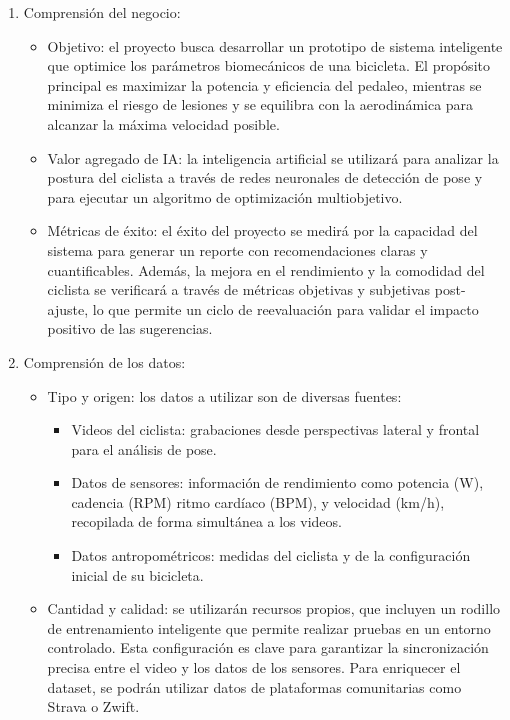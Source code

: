 \documentclass[
11pt, %
]{charter}
\begin{document}
\begin{enumerate}
  \item Comprensión del negocio:
    \begin{itemize}
      \item Objetivo: el proyecto busca desarrollar un prototipo de sistema inteligente que optimice los parámetros biomecánicos de una bicicleta. El propósito principal es maximizar la potencia y eficiencia del pedaleo, mientras se minimiza el riesgo de lesiones y se equilibra con la aerodinámica para alcanzar la máxima velocidad posible.
      \item Valor agregado de IA: la inteligencia artificial se utilizará para analizar la postura del ciclista a través de redes neuronales de detección de pose y para ejecutar un algoritmo de optimización multiobjetivo.
      \item Métricas de éxito: el éxito del proyecto se medirá por la capacidad del sistema para generar un reporte con recomendaciones claras y cuantificables. Además, la mejora en el rendimiento y la comodidad del ciclista se verificará a través de métricas objetivas y subjetivas post-ajuste, lo que permite un ciclo de reevaluación para validar el impacto positivo de las sugerencias.
    \end{itemize}

  \item Comprensión de los datos:
    \begin{itemize}
      \item Tipo y origen: los datos a utilizar son de diversas fuentes:
        \begin{itemize}
          \item Videos del ciclista: grabaciones desde perspectivas lateral y frontal para el análisis de pose.
          \item Datos de sensores: información de rendimiento como potencia (W), cadencia (RPM) ritmo cardíaco (BPM), y velocidad (km/h), recopilada de forma simultánea a los videos.
          \item Datos antropométricos: medidas del ciclista y de la configuración inicial de su bicicleta.
        \end{itemize}
      \item Cantidad y calidad: se utilizarán recursos propios, que incluyen un rodillo de entrenamiento inteligente que permite realizar pruebas en un entorno controlado. Esta configuración es clave para garantizar la sincronización precisa entre el video y los datos de los sensores. Para enriquecer el dataset, se podrán utilizar datos de plataformas comunitarias como Strava o Zwift.
    \end{itemize}


\end{enumerate}
\end{document}
